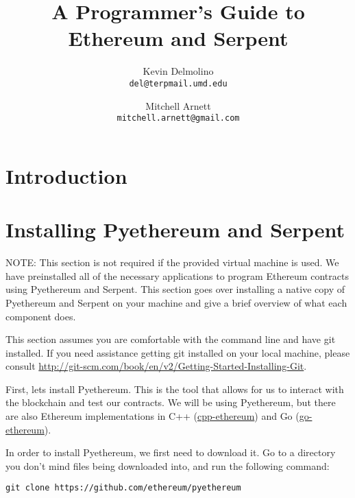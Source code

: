 \documentclass[12pt]{article}
\begin{document}
\title{A Programmer's Guide to Ethereum and Serpent}

\author{
  Kevin Delmolino\\
  \texttt{del@terpmail.umd.edu}
  \and
  Mitchell Arnett\\
  \texttt{mitchell.arnett@gmail.com}
}

\maketitle

\setcounter{tocdepth}{5}
\tableofcontents

\section{Introduction}


\section{Installing Pyethereum and Serpent}
\begin{framed}
NOTE: This section is not required if the provided virtual machine is used. We have preinstalled all of the necessary applications to program Ethereum contracts using Pyethereum and Serpent. This section goes over installing a native copy of Pyethereum and Serpent on your machine and give a brief overview of what each component does.
\end{framed}

This section assumes you are comfortable with the command line and have git installed. If you need assistance getting git installed on your local machine, please consult \url{http://git-scm.com/book/en/v2/Getting-Started-Installing-Git}.

First, lets install Pyethereum. This is the tool that allows for us to interact with the blockchain and test our contracts. We will be using Pyethereum, but there are also Ethereum implementations in C++ (\href{https://github.com/ethereum/cpp-ethereum}{cpp-ethereum}) and Go (\href{https://github.com/ethereum/go-ethereum}{go-ethereum}).

In order to install Pyethereum, we first need to download it. Go to a directory you don't mind files being downloaded into, and run the following command:

\begin{lstlisting}
git clone https://github.com/ethereum/pyethereum
\end{lstlisting}
\end{document}

